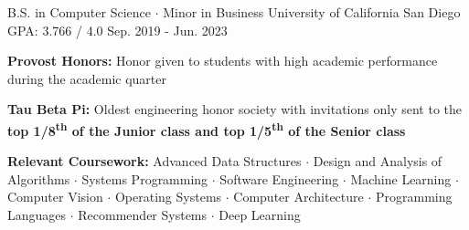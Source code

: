 

\begin{cventries}

  \cventry
    {B.S. in Computer Science $\cdot$ Minor in Business} %
    {University of California San Diego} %
    {GPA: 3.766 / 4.0} %
    {Sep. 2019 - Jun. 2023} %
    {
      \begin{cvitems} %
        \item {\textbf{Provost Honors:} Honor given to students with high academic performance during the academic quarter}
        \item {\textbf{Tau Beta Pi:} Oldest engineering honor society with invitations only sent to the \textbf{top 1/8\textsuperscript{th} of the Junior class and top 1/5\textsuperscript{th} of the Senior class}}
        \item {\textbf{Relevant Coursework:} Advanced Data Structures $\cdot$ Design and Analysis of Algorithms $\cdot$ Systems Programming $\cdot$ Software Engineering $\cdot$ Machine Learning $\cdot$ Computer Vision $\cdot$ Operating Systems $\cdot$ Computer Architecture $\cdot$ Programming Languages $\cdot$ Recommender Systems $\cdot$ Deep Learning}
      \end{cvitems}
    }

\end{cventries}
